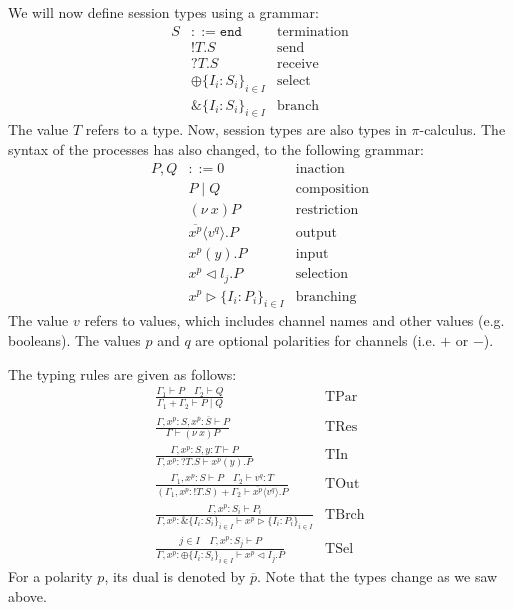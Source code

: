 \documentclass[a4paper, openany]{memoir}
\theoremstyle{definition}
\begin{document}
    We will now define session types using a grammar:
    \begin{align*}
        S &::= \texttt{end} & \textrm{termination} \\
        & !T.S & \textrm{send} \\
        &?T.S & \textrm{receive} \\
        &\oplus \{I_i \colon S_i\}_{i \in I} & \textrm{select} \\
        &\& \{I_i \colon S_i\}_{i \in I} & \textrm{branch} 
    \end{align*}
    The value $T$ refers to a type. Now, session types are also types in $\pi$-calculus. The syntax of the processes has also changed, to the following grammar:
    \begin{align*}
        P, Q &::= 0 & \textrm{inaction} \\
        & P \mid Q & \textrm{composition} \\
        & (\nu \ x)P & \textrm{restriction} \\
        & \overline{x^p} \langle v^q \rangle.P & \textrm{output} \\
        & x^p (y).P & \textrm{input} \\
        & x^p \vartriangleleft l_j.P & \textrm{selection} \\
        & x^p \vartriangleright \{I_i \colon P_i\}_{i \in I} & \textrm{branching}
    \end{align*}
    The value $v$ refers to values, which includes channel names and other values (e.g. booleans). The values $p$ and $q$ are optional polarities for channels (i.e. $+$ or $-$).

    The typing rules are given as follows:
    \begin{align*}
        \frac{\Gamma_1 \vdash P \quad \Gamma_2 \vdash Q}{\Gamma_1 + \Gamma_2 \vdash P \mid Q} & \textrm{TPar} \\
        \frac{\Gamma, x^p \colon S, x^{\overline{p}} \colon \overline{S} \vdash P}{\Gamma \vdash (\nu \ x)P} & \textrm{TRes} \\
        \frac{\Gamma, x^p \colon S, y \colon T \vdash P}{\Gamma, x^p \colon ?T.S \vdash x^p(y).P} &\textrm{TIn} \\
        \frac{\Gamma_1, x^p \colon S \vdash P \quad \Gamma_2 \vdash v^q \colon T}{(\Gamma_1, x^p \colon !T.S) + \Gamma_2 \vdash \overline{x^p} \langle v^q \rangle.P} &\textrm{TOut} \\
        \frac{\Gamma, x^p \colon S_i \vdash P_i}{\Gamma, x^p \colon \& \{I_i \colon S_i\}_{i \in I} \vdash x^p \vartriangleright \{I_i \colon P_i\}_{i \in I}} & \textrm{TBrch} \\
        \frac{j \in I \quad \Gamma, x^p \colon S_j \vdash P}{\Gamma, x^p \colon \oplus \{I_i \colon S_i\}_{i \in I} \vdash x^p \vartriangleleft I_j.P} & \textrm{TSel}
    \end{align*}
    For a polarity $p$, its dual is denoted by $\overline{p}$. Note that the types change as we saw above.
\end{document}
